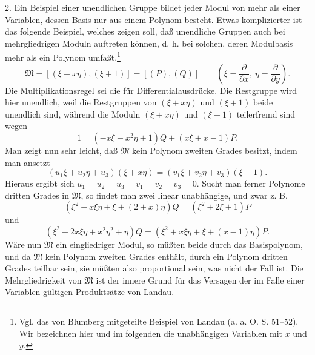 \documentclass[11pt]{article}
\begin{document}
2. Ein Beispiel einer unendlichen Gruppe bildet jeder Modul von mehr als einer Variablen, dessen Basis nur aus einem Polynom besteht. Etwas komplizierter ist das folgende Beispiel, welches zeigen soll, daß unendliche Gruppen auch bei mehrgliedrigen Moduln auftreten können, d. h. bei solchen, deren Modulbasis mehr als ein Polynom umfaßt.\footnote{Vgl. das von Blumberg mitgeteilte Beispiel von Landau (a. a. O. S. 51--52). Wir bezeichnen hier und im folgenden die unabhängigen Variablen mit $x$ und $y$.}
\[
 \mathfrak M=[(\xi+x\eta),(\xi+1)]=[(P),(Q)]
 \qquad\left(\xi=\frac{\partial}{\partial x},\ \eta=\frac{\partial}{\partial y}\right).
\]
Die Multiplikationsregel sei die für Differentialausdrücke. Die Restgruppe wird hier unendlich, weil die Restgruppen von $(\xi+x\eta)$ und $(\xi+1)$ beide unendlich sind, während die Moduln $(\xi+x\eta)$ und $(\xi+1)$ teilerfremd sind wegen
\[
 1=(-x\xi-x^2\eta+1)Q+(x\xi+x-1)P.
\]
Man zeigt nun sehr leicht, daß $\mathfrak M$ kein Polynom zweiten Grades besitzt, indem man ansetzt
\[
 (u_1\xi+u_2\eta+u_3)(\xi+x\eta)=(v_1\xi+v_2\eta+v_3)(\xi+1).
\]
Hieraus ergibt sich $u_1=u_2=u_3=v_1=v_2=v_3=0$. Sucht man ferner Polynome dritten Grades in $\mathfrak M$, so findet man zwei linear unabhängige, und zwar z. B.
\[
 (\xi^2+x\xi\eta+\xi+(2+x)\eta)Q=(\xi^2+2\xi+1)P
\]
und
\[
 (\xi^2+2x\xi\eta+x^2\eta^2+\eta)Q
 =(\xi^2+x\xi\eta+\xi+(x-1)\eta)P.
\]
Wäre nun $\mathfrak M$ ein eingliedriger Modul, so müßten beide durch das Basispolynom, und da $\mathfrak M$ kein Polynom zweiten Grades enthält, durch ein Polynom dritten Grades teilbar sein, sie müßten also proportional sein, was nicht der Fall ist. Die Mehrgliedrigkeit von $\mathfrak M$ ist der innere Grund für das Versagen der im Falle einer Variablen gültigen Produktsätze von Landau.
\end{document}
